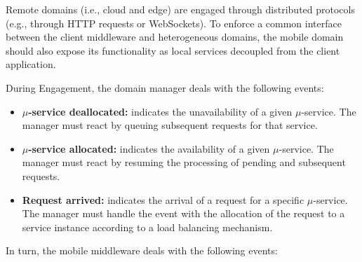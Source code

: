 Remote domains (i.e., cloud and edge) are engaged through distributed protocols (e.g., through HTTP requests or WebSockets). To enforce a common interface between the client middleware and heterogeneous domains, the mobile domain should also expose its functionality as local services decoupled from the client application.

During Engagement, the domain manager deals with the following events:

\begin{itemize}
	
	\item \textbf{$\mu$-service deallocated:} indicates the unavailability of a given $\mu$-service. The manager must react by queuing subsequent requests for that service.
		
	\item \textbf{$\mu$-service allocated:} indicates the availability of a given $\mu$-service. The manager must react by resuming the processing of pending and subsequent requests.
	

	\item \textbf{Request arrived:} indicates the arrival of a request for a specific $\mu$-service. The manager must handle the event with the allocation of the request to a service instance according to a load balancing mechanism.
\end{itemize}

In turn, the mobile middleware deals with the following events:

